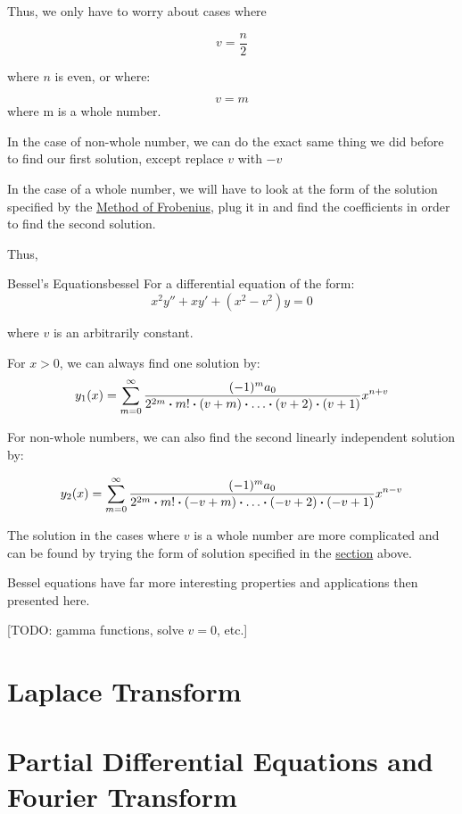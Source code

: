 \documentclass{report}
\begin{document}
{Thus, we only have to worry about cases where

$$v=\frac{n}{2}$$

where $n$ is even, or where:

$$v=m$$
where m is a whole number.

In the case of non-whole number, we can do the exact same thing we did before to find our first solution, except replace $v$ with $-v$

In the case of a whole number, we will have to look at the form of the solution specified by the \hyperref[sec:methodOfFrobenius]{Method of Frobenius}, plug it in and find the coefficients in order to find the second solution.

Thus,

\begin{mytheo}{Bessel's Equations}{bessel}
	For a differential equation of the form:
	$$x^2y'' + xy' + (x^2-v^2)y = 0$$
	
	where $v$ is an arbitrarily constant.
	
	For $x>0$, we can always find one solution by:
	$$
	y_1(x) = \sum_{m=0}^\infty \frac{(-1)^ma_0}{2^{2m}\vdot m! \vdot(v+m)\vdot\dots\vdot(v+2)\vdot(v+1)} x^{n+v}
	$$
	
	For non-whole numbers, we can also find the second linearly independent solution by:
	
	$$
	y_2(x) = \sum_{m=0}^\infty \frac{(-1)^ma_0}{2^{2m}\vdot m! \vdot(-v+m)\vdot\dots\vdot(-v+2)\vdot(-v+1)} x^{n-v}
	$$
	
	The solution in the cases where $v$ is a whole number are more complicated and can be found by trying the form of solution specified in the \hyperref[sec:methodOfFrobenius]{section} above.
	
\end{mytheo}

Bessel equations have far more interesting properties and applications then presented here.

[TODO: gamma functions, solve $v=0$, etc.]


\chapter{Laplace Transform}

\chapter{Partial Differential Equations and Fourier Transform}

}
\end{document}

